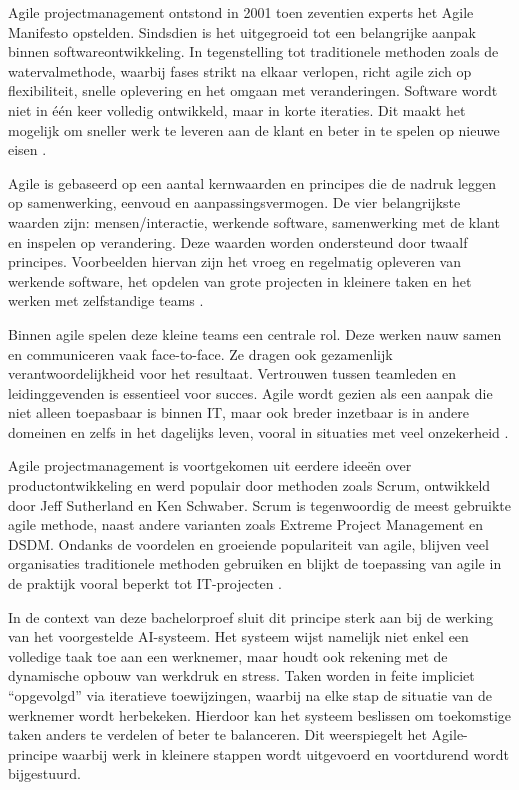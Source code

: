Agile projectmanagement ontstond in 2001 toen zeventien experts het Agile Manifesto opstelden. Sindsdien is het uitgegroeid tot een belangrijke aanpak binnen softwareontwikkeling. In tegenstelling tot traditionele methoden zoals de watervalmethode, waarbij fases strikt na elkaar verlopen, richt agile zich op flexibiliteit, snelle oplevering en het omgaan met veranderingen. Software wordt niet in één keer volledig ontwikkeld, maar in korte iteraties. Dit maakt het mogelijk om sneller werk te leveren aan de klant en beter in te spelen op nieuwe eisen \autocite{Koi_Akrofi_2019}.

\vspace{1em}Agile is gebaseerd op een aantal kernwaarden en principes die de nadruk leggen op samenwerking, eenvoud en aanpassingsvermogen. De vier belangrijkste waarden zijn: mensen/interactie, werkende software, samenwerking met de klant en inspelen op verandering. Deze waarden worden ondersteund door twaalf principes. Voorbeelden hiervan zijn het vroeg en regelmatig opleveren van werkende software, het opdelen van grote projecten in kleinere taken en het werken met zelfstandige teams \autocite{Koi_Akrofi_2019}.

Binnen agile spelen deze kleine teams een centrale rol. Deze werken nauw samen en communiceren vaak face-to-face. Ze dragen ook gezamenlijk verantwoordelijkheid voor het resultaat. Vertrouwen tussen teamleden en leidinggevenden is essentieel voor succes. Agile wordt gezien als een aanpak die niet alleen toepasbaar is binnen IT, maar ook breder inzetbaar is in andere domeinen en zelfs in het dagelijks leven, vooral in situaties met veel onzekerheid \autocite{Koi_Akrofi_2019}.

Agile projectmanagement is voortgekomen uit eerdere ideeën over productontwikkeling en werd populair door methoden zoals Scrum, ontwikkeld door Jeff Sutherland en Ken Schwaber. Scrum is tegenwoordig de meest gebruikte agile methode, naast andere varianten zoals Extreme Project Management en DSDM. Ondanks de voordelen en groeiende populariteit van agile, blijven veel organisaties traditionele methoden gebruiken en blijkt de toepassing van agile in de praktijk vooral beperkt tot IT-projecten \autocite{Koi_Akrofi_2019}.

In de context van deze bachelorproef sluit dit principe sterk aan bij de werking van het voorgestelde AI-systeem. Het systeem wijst namelijk niet enkel een volledige taak toe aan een werknemer, maar houdt ook rekening met de dynamische opbouw van werkdruk en stress. Taken worden in feite impliciet “opgevolgd” via iteratieve toewijzingen, waarbij na elke stap de situatie van de werknemer wordt herbekeken. Hierdoor kan het systeem beslissen om toekomstige taken anders te verdelen of beter te balanceren. Dit weerspiegelt het Agile-principe waarbij werk in kleinere stappen wordt uitgevoerd en voortdurend wordt bijgestuurd.

